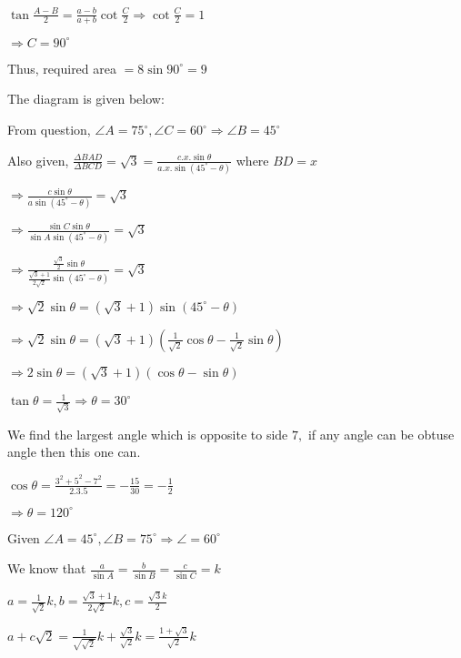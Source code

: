   $\tan\frac{A - B}{2} = \frac{a - b}{a + b}\cot\frac{C}{2} \Rightarrow \cot\frac{C}{2} = 1$

  $\Rightarrow C = 90^\circ$

  Thus, required area $= 8\sin90^\circ = 9$

\item The diagram is given below:

  \startplacefigure
    \externalfigure[18_1.pdf]
  \stopplacefigure

  From question, $\angle A = 75^\circ, \angle C = 60^\circ \Rightarrow \angle B = 45^\circ$

  Also given, $\frac{\Delta BAD}{\Delta BCD} = \sqrt{3} = \frac{c.x.\sin\theta}{a.x.\sin(45^\circ - \theta)}$ where
  $BD = x$

  $\Rightarrow \frac{c\sin\theta}{a\sin(45^\circ - \theta)} = \sqrt{3}$

  $\Rightarrow \frac{\sin C\sin\theta}{\sin A\sin(45^\circ - \theta)} = \sqrt{3}$

  $\Rightarrow \frac{\frac{\sqrt{3}}{2}\sin\theta}{\frac{\sqrt{3} + 1}{2\sqrt{2}}\sin(45^\circ - \theta)} = \sqrt{3}$

  $\Rightarrow \sqrt{2}\sin\theta = (\sqrt{3} + 1)\sin(45^\circ - \theta)$

  $\Rightarrow \sqrt{2}\sin\theta = (\sqrt{3} + 1)\left(\frac{1}{\sqrt{2}}\cos\theta - \frac{1}{\sqrt{2}}\sin\theta\right)$

  $\Rightarrow 2\sin\theta = (\sqrt{3} + 1)(\cos\theta - \sin\theta)$

  $\tan\theta = \frac{1}{\sqrt{3}} \Rightarrow \theta = 30^\circ$

\item We find the largest angle which is opposite to side $7,$ if any angle can be obtuse angle then this one can.

  $\cos \theta = \frac{3^2 + 5^2 - 7^2}{2.3.5} = -\frac{15}{30} = -\frac{1}{2}$

  $\Rightarrow \theta = 120^\circ$

\item Given $\angle A = 45^\circ, \angle B = 75^\circ \Rightarrow \angle = 60^\circ$

  We know that $\frac{a}{\sin A} = \frac{b}{\sin B} = \frac{c}{\sin C} = k$

  $a = \frac{1}{\sqrt{2}}k, b = \frac{\sqrt{3} + 1}{2\sqrt{2}}k, c = \frac{\sqrt{3}k}{2}$

  $a + c\sqrt{2} = \frac{1}{\sqrt{\sqrt{2}}}k + \frac{\sqrt{3}}{\sqrt{2}}k = \frac{1 + \sqrt{3}}{\sqrt{2}}k$

